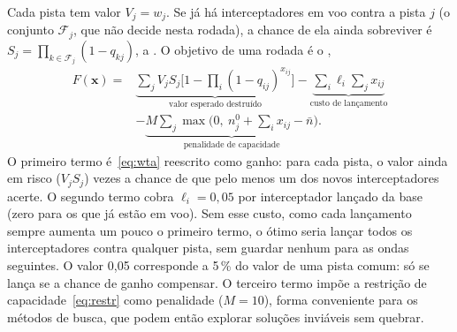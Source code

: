 Cada pista tem valor $V_j=w_j$. Se já há interceptadores em voo contra a pista $j$ (o conjunto $\mathcal{F}_j$, que não
decide nesta rodada), a chance de ela ainda sobreviver é $S_j=\prod_{k\in\mathcal{F}_j}(1-q_{kj})$, a
. O objetivo de uma rodada é o ,
\begin{equation}
  \begin{split}
  F(\bm{x}) ={}& \underbrace{\sum_j V_j S_j\Big[1-\prod_{i}(1-q_{ij})^{x_{ij}}\Big]}_{\text{valor esperado destruído}}
  - \underbrace{\sum_{i}\ell_i\sum_j x_{ij}}_{\text{custo de lançamento}}\\
  &- \underbrace{M\sum_j\max\!\Big(0,\ n_j^0+\sum_i x_{ij}-\bar n\Big)}_{\text{penalidade de capacidade}} .
  \end{split}
  \label{eq:F}
\end{equation}
O primeiro termo é~\eqref{eq:wta} reescrito como ganho: para cada pista, o valor ainda em risco ($V_jS_j$) vezes a
chance de que pelo menos um dos novos interceptadores acerte. O segundo termo cobra $\ell_i=0{,}05$ por interceptador
lançado da base (zero para os que já estão em voo). Sem esse custo, como cada lançamento sempre aumenta um pouco o
primeiro termo, o ótimo seria lançar todos os interceptadores contra qualquer pista, sem guardar nenhum para as ondas
seguintes. O valor 0,05 corresponde a 5\,\% do valor de uma pista comum: só se lança se a chance de ganho compensar. O
terceiro termo impõe a restrição de capacidade~\eqref{eq:restr} como penalidade ($M=10$), forma conveniente para os
métodos de busca, que podem então explorar soluções inviáveis sem quebrar.
